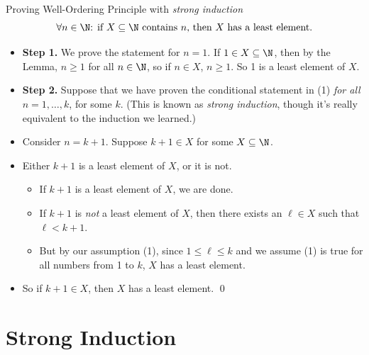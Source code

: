 \documentclass[11pt,aspectratio=1610,handout]{beamer}
\begin{document}
\begin{frame}{Proving Well-Ordering Principle with \emph{strong induction}}
	\setcounter{equation}{0}
	\vspace{-0.3in}
	\begin{equation}
	\textrm{$\forall n \in \N$: if $X\subseteq \N$ contains $n$, then $X$ has a least element.}
	\end{equation}
	\begin{itemize} 
		\item \textbf{Step 1.} We prove the statement for $n=1$. If $1 \in X \subseteq \N$, then by the Lemma, $n \geq 1$ for all $n\in \N$, so if $n \in X$, $n \geq 1$. So 1 is a least element of $X$. \p
		\item \textbf{Step 2.} Suppose that we have proven the conditional statement in (1) \emph{for all} $n = 1, \ldots, k$, for some $k$. (This is known as \emph{strong induction}, though it's really equivalent to the induction we learned.) \p
		\item Consider $n=k+1$. Suppose $k+1 \in X$ for some $X \subseteq \N$. \p
		\item Either $k+1$ is a least element of $X$, or it is not. \p
		\begin{itemize}
			\item If $k+1$ is a least element of $X$, we are done. \p
			\item If $k+1$ is \emph{not} a least element of $X$, then there exists an $\ell \in X$ such that $\ell < k+1$. \p
			\item But by our assumption (1), since $1 \leq \ell \leq k$ and we assume (1) is true for all numbers from 1 to $k$, $X$ has a least element. \p
		\end{itemize}
		\item So if $k+1 \in X$, then $X$ has a least element. \qed
	\end{itemize} 
\end{frame}



\section{Strong Induction}
\end{document}
